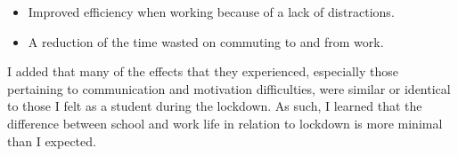 \begin{itemize}
    \item Improved efficiency when working because of a lack of distractions.
    \item A reduction of the time wasted on commuting to and from work.
\end{itemize}

I added that many of the effects that they experienced, especially those pertaining to communication and motivation difficulties, were similar or identical to those I felt as a student during the lockdown. As such, I learned that the difference between school and work life in relation to lockdown is more minimal than I expected.
